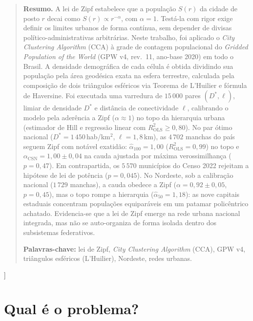 \documentclass[10pt,a4paper,twocolumn]{article}
\begin{document}
\begin{@twocolumnfalse}
\begin{quote}\small
\noindent\textbf{Resumo.}
A lei de Zipf estabelece que a população $S(r)$ da cidade de posto $r$ decai como $S(r)\propto r^{-\alpha}$, com $\alpha=1$. Testá-la com rigor exige definir os limites urbanos de forma contínua, sem depender de divisas político-administrativas arbitrárias. Neste trabalho, foi aplicado o \emph{City Clustering Algorithm} (CCA) à grade de contagem populacional do \emph{Gridded Population of the World} (GPW v4, rev.~11, ano-base 2020) em todo o Brasil. A densidade demográfica de cada célula é obtida dividindo sua população pela área geodésica exata na esfera terrestre, calculada pela composição de dois triângulos esféricos via Teorema de L'Huilier e fórmula de Haversine. Foi executada uma varredura de $15\,000$ pares $(D^{*},\ell)$, limiar de densidade $D^{*}$ e distância de conectividade $\ell$, calibrando o modelo pela aderência a Zipf ($\alpha \approx 1$) no topo da hierarquia urbana (estimador de Hill e regressão linear com $R^{2}_{\mathrm{OLS}}\geq 0{,}80$). No par ótimo nacional ($D^{*}=1\,450$\,hab/km$^{2}$, $\ell=1{,}8$\,km), as $4\,702$ manchas do país seguem Zipf com notável exatidão: $\hat{\alpha}_{100}=1{,}00$ ($R^{2}_{\mathrm{OLS}}=0{,}99$) no topo e $\alpha_{\mathrm{CSN}}=1{,}00\pm0{,}04$ na cauda ajustada por máxima verossimilhança ($p=0{,}47$). Em contrapartida, os $5\,570$ municípios do Censo 2022 rejeitam a hipótese de lei de potência ($p=0{,}045$). No Nordeste, sob a calibração nacional ($1\,729$ manchas), a cauda obedece a Zipf ($\alpha=0{,}92\pm0{,}05$, $p=0{,}45$), mas o topo rompe a hierarquia ($\hat{\alpha}_{50}=1{,}18$): as nove capitais estaduais concentram populações equiparáveis em um patamar policêntrico achatado. Evidencia-se que a lei de Zipf emerge na rede urbana nacional integrada, mas não se auto-organiza de forma isolada dentro dos subsistemas federativos.

\vspace{0.06cm}
\noindent\textbf{Palavras-chave:} lei de Zipf, \emph{City Clustering Algorithm} (CCA), GPW v4, triângulos esféricos (L'Huilier), Nordeste, redes urbanas.
\end{quote}
\vspace{0.14cm}
\end{@twocolumnfalse}
]

\section{Qual é o problema?}
\end{document}
